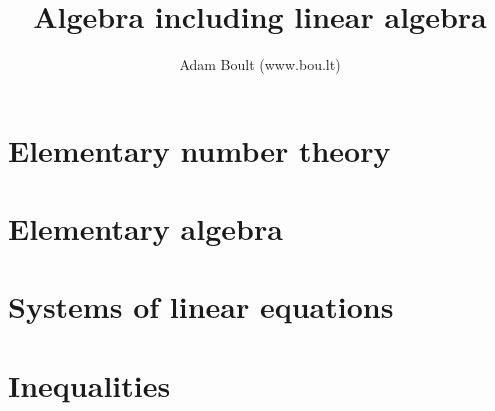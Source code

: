\documentclass[oneside]{book}
\begin{document}
\author{Adam Boult (www.bou.lt)}
\title{Algebra including linear algebra}
\maketitle

\setcounter{tocdepth}{0}
\tableofcontents



\part{Elementary number theory}






\part{Elementary algebra}






\part{Systems of linear equations}




\part{Inequalities}

\end{document}
